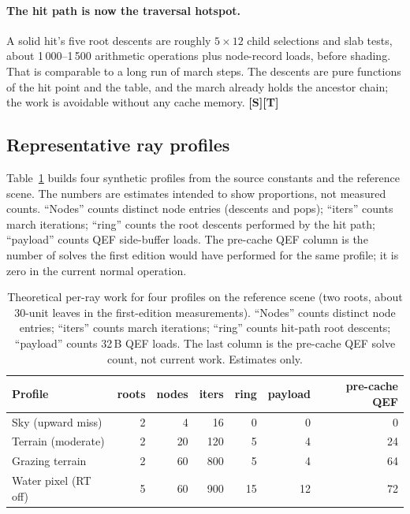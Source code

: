 \documentclass[11pt,a4paper]{article}
\newcommand{\evS}{\textsf{\textbf{\color{evS}[S]}}}
\newcommand{\evT}{\textsf{\textbf{\color{evT}[T]}}}
\theoremstyle{plain}
\theoremstyle{definition}
\theoremstyle{remark}
\begin{document}
\paragraph{The hit path is now the traversal hotspot.} A solid hit's five root
descents are roughly $5\times12$ child selections and slab tests, about
1\,000--1\,500 arithmetic operations plus node-record loads, before shading.
That is comparable to a long run of march steps. The descents are pure
functions of the hit point and the table, and the march already holds the
ancestor chain; the work is avoidable without any cache memory. \evS\evT

\subsection{Representative ray profiles}

Table~\ref{tab:profiles} builds four synthetic profiles from the source
constants and the reference scene. The numbers are estimates intended to show
proportions, not measured counts. ``Nodes'' counts distinct node entries
(descents and pops); ``iters'' counts march iterations; ``ring'' counts the
root descents performed by the hit path; ``payload'' counts QEF side-buffer
loads. The pre-cache QEF column is the number of solves the first edition would
have performed for the same profile; it is zero in the current normal
operation.

\begin{table}[t]
\centering
\small
\caption{Theoretical per-ray work for four profiles on the reference scene
(two roots, about 30-unit leaves in the first-edition measurements). ``Nodes''
counts distinct node entries; ``iters'' counts march iterations; ``ring''
counts hit-path root descents; ``payload'' counts 32\,B QEF loads. The last
column is the pre-cache QEF solve count, not current work. Estimates only.}
\label{tab:profiles}
\begin{tabular}{@{}lrrrrrr@{}}
\toprule
Profile & roots & nodes & iters & ring & payload & pre-cache QEF \\
\midrule
Sky (upward miss) & 2 & 4 & 16 & 0 & 0 & 0 \\
Terrain (moderate) & 2 & 20 & 120 & 5 & 4 & 24 \\
Grazing terrain & 2 & 60 & 800 & 5 & 4 & 64 \\
Water pixel (RT off) & 5 & 60 & 900 & 15 & 12 & 72 \\
\bottomrule
\end{tabular}
\end{table}
\end{document}
